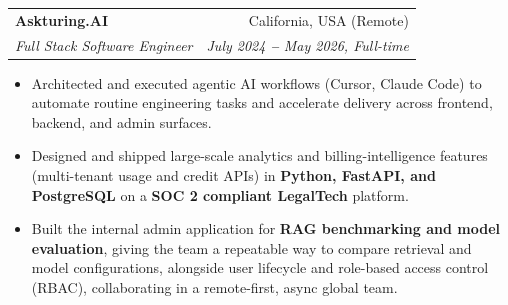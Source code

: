 \documentclass[a4paper,11pt]{article}
\makeatletter
\newcommand{\resumeItem}[1]{
  \item\small{\justifying #1 \vspace{-2pt}}
}
\newcommand{\resumeSubheading}[4]{
  \vspace{-2pt}\item
    \begin{tabular*}{0.97\textwidth}[t]{l@{\extracolsep{\fill}}r}
      \textbf{#1} & #2 \\
      \textit{\small#3} & \textit{\small #4} \\
    \end{tabular*}\vspace{-7pt}
}
\newcommand{\resumeItemListStart}{\begin{itemize}[leftmargin=0.2in]}
\newcommand{\resumeItemListEnd}{\end{itemize}\vspace{-5pt}}
\makeatother
\begin{document}
\resumeSubheading
  {Askturing.AI}{California, USA (Remote)}
  {Full Stack Software Engineer}{July 2024 \textbf{--} May 2026, Full-time}
  \resumeItemListStart
    \resumeItem{Architected and executed agentic AI workflows (Cursor, Claude Code) to automate routine engineering tasks and accelerate delivery across frontend, backend, and admin surfaces.}
    \resumeItem{Designed and shipped large-scale analytics and billing-intelligence features (multi-tenant usage and credit APIs) in \textbf{Python, FastAPI, and PostgreSQL} on a \textbf{SOC 2 compliant LegalTech} platform.}
    \resumeItem{Built the internal admin application for \textbf{RAG benchmarking and model evaluation}, giving the team a repeatable way to compare retrieval and model configurations, alongside user lifecycle and role-based access control (RBAC), collaborating in a remote-first, async global team.}
  \resumeItemListEnd

\end{document}
